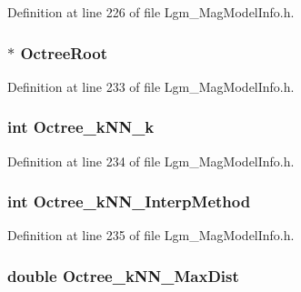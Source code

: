 Definition at line 226 of file Lgm\_\-MagModelInfo.h.\hypertarget{struct_lgm___mag_model_info_3c296eee871865d5eb14f0e46f242d52}{
\subsubsection[{OctreeRoot}]{$\ast$ {\bf OctreeRoot}}}
\label{struct_lgm___mag_model_info_3c296eee871865d5eb14f0e46f242d52}




Definition at line 233 of file Lgm\_\-MagModelInfo.h.\hypertarget{struct_lgm___mag_model_info_99cfcbf0b2cc678489e5610f95ba444f}{
\subsubsection[{Octree\_\-kNN\_\-k}]{\setlength{\rightskip}{0pt plus 5cm}int {\bf Octree\_\-kNN\_\-k}}}
\label{struct_lgm___mag_model_info_99cfcbf0b2cc678489e5610f95ba444f}




Definition at line 234 of file Lgm\_\-MagModelInfo.h.\hypertarget{struct_lgm___mag_model_info_5f46c646591dc34aa1dd15ae784de211}{
\subsubsection[{Octree\_\-kNN\_\-InterpMethod}]{\setlength{\rightskip}{0pt plus 5cm}int {\bf Octree\_\-kNN\_\-InterpMethod}}}
\label{struct_lgm___mag_model_info_5f46c646591dc34aa1dd15ae784de211}




Definition at line 235 of file Lgm\_\-MagModelInfo.h.\hypertarget{struct_lgm___mag_model_info_8bb4098863c80f1488ba2210a992c1c7}{
\subsubsection[{Octree\_\-kNN\_\-MaxDist}]{\setlength{\rightskip}{0pt plus 5cm}double {\bf Octree\_\-kNN\_\-MaxDist}}}
\label{struct_lgm___mag_model_info_8bb4098863c80f1488ba2210a992c1c7}




